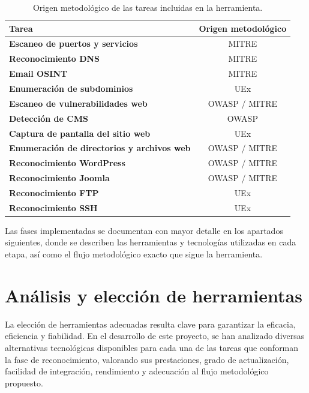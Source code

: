 \begin{parskipenv}
\begin{table}[H]
\centering
\renewcommand{\arraystretch}{1.2}
\begin{tabular}{|>{\columncolor{LightBlue}}l|c|}
\hline
\rowcolor{LightBlue}
\textbf{Tarea} & \textbf{Origen metodológico} \\
\hline
\textbf{Escaneo de puertos y servicios}               & MITRE         \\
\hline
\textbf{Reconocimiento DNS}                           & MITRE         \\
\hline
\textbf{Email OSINT}                                  & MITRE         \\
\hline
\textbf{Enumeración de subdominios}                   & UEx           \\
\hline
\textbf{Escaneo de vulnerabilidades web}              & OWASP / MITRE \\
\hline
\textbf{Detección de CMS}                             & OWASP         \\
\hline
\textbf{Captura de pantalla del sitio web}            & UEx           \\
\hline
\textbf{Enumeración de directorios y archivos web}    & OWASP / MITRE \\
\hline
\textbf{Reconocimiento WordPress}                     & OWASP / MITRE \\
\hline
\textbf{Reconocimiento Joomla}                        & OWASP / MITRE \\
\hline
\textbf{Reconocimiento FTP}              & UEx           \\
\hline
\textbf{Reconocimiento SSH}              & UEx           \\
\hline
\end{tabular}
\caption{Origen metodológico de las tareas incluidas en la herramienta.}
\label{tabla:origen_tareas}
\end{table}

Las fases implementadas se documentan con mayor detalle en los apartados siguientes, donde se describen las herramientas y tecnologías utilizadas en cada etapa, así como el flujo metodológico exacto que sigue la herramienta.

\section{Análisis y elección de herramientas}
La elección de herramientas adecuadas resulta clave para garantizar la eficacia, eficiencia y fiabilidad. En el desarrollo de este proyecto, se han analizado diversas alternativas tecnológicas disponibles para cada una de las tareas que conforman la fase de reconocimiento, valorando sus prestaciones, grado de actualización, facilidad de integración, rendimiento y adecuación al flujo metodológico propuesto.


\end{parskipenv}
